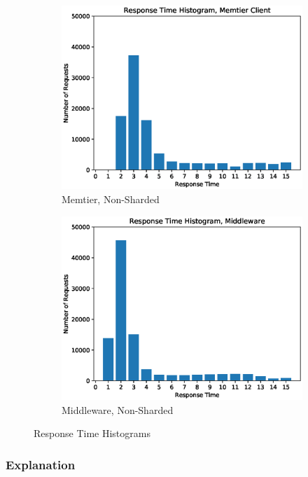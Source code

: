 \documentclass[11pt,a4paper]{article}
\begin{document}
\begin{figure}
    \begin{subfigure}{.5\textwidth}
        \includegraphics[width=1\linewidth]{plots/logSection5d_histogramMemtier.eps}
        \caption{Memtier, Non-Sharded}
    \end{subfigure}
    \begin{subfigure}{.5\textwidth}
        \includegraphics[width=1\linewidth]{plots/logSection5d_histogramMiddleware.eps}
        \caption{Middleware, Non-Sharded}
    \end{subfigure}
    \caption{Response Time Histograms}
    \label{fig:5-1:Histograms}
\end{figure}

\subsubsection{Explanation}
\end{document}
